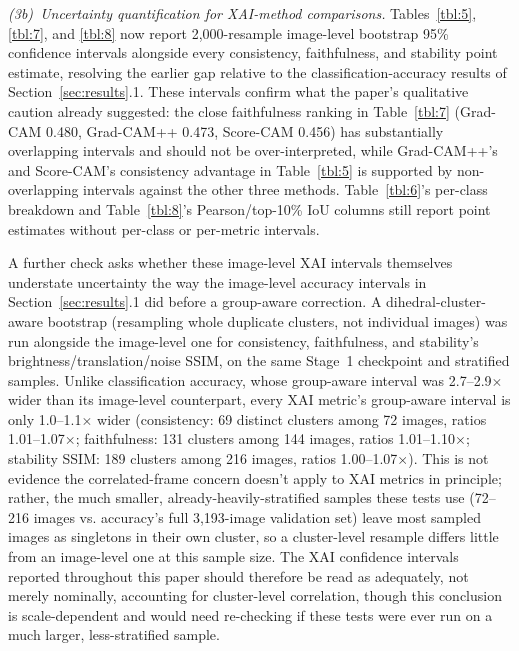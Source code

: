 \textit{(3b)~Uncertainty quantification for XAI-method comparisons.} Tables~\ref{tbl:5}, \ref{tbl:7}, and \ref{tbl:8} now report 2,000-resample image-level bootstrap 95\% confidence intervals alongside every consistency, faithfulness, and stability point estimate, resolving the earlier gap relative to the classification-accuracy results of Section~\ref{sec:results}.1. These intervals confirm what the paper's qualitative caution already suggested: the close faithfulness ranking in Table~\ref{tbl:7} (Grad-CAM 0.480, Grad-CAM++ 0.473, Score-CAM 0.456) has substantially overlapping intervals and should not be over-interpreted, while Grad-CAM++'s and Score-CAM's consistency advantage in Table~\ref{tbl:5} is supported by non-overlapping intervals against the other three methods. Table~\ref{tbl:6}'s per-class breakdown and Table~\ref{tbl:8}'s Pearson/top-10\% IoU columns still report point estimates without per-class or per-metric intervals.

A further check asks whether these image-level XAI intervals themselves understate uncertainty the way the image-level accuracy intervals in Section~\ref{sec:results}.1 did before a group-aware correction. A dihedral-cluster-aware bootstrap (resampling whole duplicate clusters, not individual images) was run alongside the image-level one for consistency, faithfulness, and stability's brightness/translation/noise SSIM, on the same Stage~1 checkpoint and stratified samples. Unlike classification accuracy, whose group-aware interval was 2.7--2.9$\times$ wider than its image-level counterpart, every XAI metric's group-aware interval is only 1.0--1.1$\times$ wider (consistency: 69 distinct clusters among 72 images, ratios 1.01--1.07$\times$; faithfulness: 131 clusters among 144 images, ratios 1.01--1.10$\times$; stability SSIM: 189 clusters among 216 images, ratios 1.00--1.07$\times$). This is not evidence the correlated-frame concern doesn't apply to XAI metrics in principle; rather, the much smaller, already-heavily-stratified samples these tests use (72--216 images vs. accuracy's full 3,193-image validation set) leave most sampled images as singletons in their own cluster, so a cluster-level resample differs little from an image-level one at this sample size. The XAI confidence intervals reported throughout this paper should therefore be read as adequately, not merely nominally, accounting for cluster-level correlation, though this conclusion is scale-dependent and would need re-checking if these tests were ever run on a much larger, less-stratified sample.


